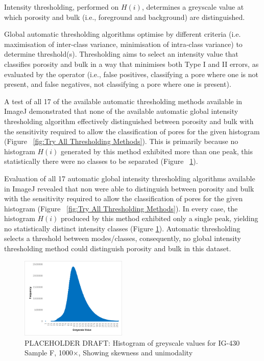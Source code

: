 \documentclass[review]{elsarticle}
\begin{document}
Intensity thresholding, performed on \(H(i)\), determines a greyscale value
at which porosity and bulk (i.e., foreground and background) are distinguished.

Global automatic thresholding algorithms optimise by different criteria (i.e.
maximisation of inter-class variance, minimisation of intra-class variance) to
determine threshold(s). Thresholding aims to select an intensity value that classifies
porosity and bulk in a way that minimises both Type I and II errors, as
evaluated by the operator (i.e., false positives, classifying a pore where one
is not present, and false negatives, not classifying a pore where one is
present).

A test of all 17 of the available automatic thresholding methods available in
ImageJ demonstrated that none of the available automatic global intensity
thresholding algorithm effectively distinguished between porosity and bulk with
the sensitivity required to allow the classification of pores for the given
histogram (Figure ~\ref{fig:Try All Thresholding Methods}). This is primarily
because no histogram \(H(i)\) generated by this method exhibited more than one
peak, this statistically there were no classes to be separated (Figure
~\ref{fig:histogramnobimodal}). 

Evaluation of all 17 automatic global intensity thresholding algorithms
available in ImageJ revealed that non were able to distinguish between porosity
and bulk with the sensitivity required to allow the classification of pores for
the given histogram (Figure ~\ref{fig:Try All Thresholding Methods}). In every
case, the histogram \(H(i)\) produced by this method exhibited only a single
peak, yielding no statistically distinct intensity classes (Figure
\ref{fig:histogramnobimodal}). Automatic thresholding selects a threshold
between modes/classes, consequently, no global intensity thresholding method
could distinguish porosity and bulk in this dataset.

    \begin{figure}
		\centering
    \includegraphics[width=0.45\textwidth]{./Media/IG430F Greyscale Histogram.png}
		\caption{PLACEHOLDER DRAFT: Histogram of greyscale values for IG-430 Sample F, 1000×, Showing skewness and unimodality}
		\label{fig:histogramnobimodal}
	\end{figure} 
\end{document}
